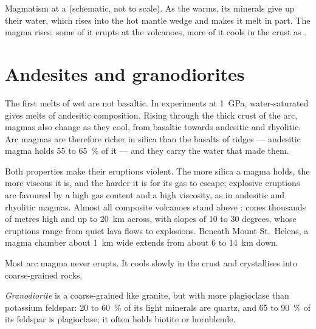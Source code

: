 \begin{omfigure}
{\small Magmatism at a  (schematic, not to scale). As the 
warms, its minerals give up their water, which rises into the hot mantle
wedge and makes it melt in part. The magma rises: some of it erupts at the
volcanoes, more of it cools in the crust as .}
\end{omfigure}

\section{Andesites and granodiorites}

The first melts of wet  are not basaltic. In experiments at
\qty{1}{GPa}, water-saturated  gives melts of andesitic
composition. Rising through the thick crust of the arc, magmas also change as
they cool, from basaltic towards andesitic and rhyolitic. Arc magmas are
therefore richer in silica than the basalts of ridges --- andesitic magma
holds 55 to \qty{65}{\percent} of it --- and they carry the water that made
them.

Both properties make their eruptions violent. The more silica a magma holds,
the more viscous it is, and the harder it is for its gas to escape; explosive
eruptions are favoured by a high gas content and a high viscosity, as in
andesitic and rhyolitic magmas. Almost all composite volcanoes stand above
: cones thousands of metres high and up to \qty{20}{km}
across, with slopes of 10 to 30 degrees, whose eruptions range from quiet
lava flows to explosions. Beneath Mount St.~Helens, a magma chamber about \qty{1}{km} wide
extends from about 6 to \qty{14}{km} down.

Most arc magma never erupts. It cools slowly in the crust and crystallises
into coarse-grained rocks.

\begin{definition}[Granodiorite]\label{def:g12:subduction-magmatism:granodiorite}
\emph{Granodiorite} is a coarse-grained 
like granite, but with more plagioclase than potassium feldspar: 20 to
\qty{60}{\percent} of its light minerals are quartz, and 65 to
\qty{90}{\percent} of its feldspar is plagioclase; it often holds biotite
or hornblende.
\end{definition}

